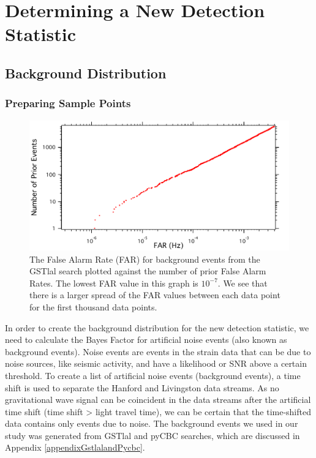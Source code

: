 \documentclass{article}
\begin{document}
 \newpage
 \section{Determining a New Detection Statistic}
 
 
 \subsection{Background Distribution}
 
 
 
 
 \subsubsection{Preparing Sample Points}
 
 
   \begin{figure}[h]
   	\centering
   	\includegraphics[width=1\textwidth]{Figures/FAP_Count.pdf} 
   	\caption{The False Alarm Rate (FAR) for background events from the GSTlal search plotted against the number of prior False Alarm Rates. The lowest FAR value in this graph is $10^{-7}$. We see that there is a larger spread of the FAR values between each data point for the first thousand data points.}
   	\label{Fig:FAR_Count}
   \end{figure}
   
   
 
 
 In order to create the background distribution for the new detection statistic, we need to calculate the Bayes Factor for artificial noise events (also known as background events). Noise events are events in the strain data that can be due to noise sources, like seismic activity, and have a likelihood or SNR above a certain threshold. To create a list of artificial noise events (background events),  a time shift is used to separate the Hanford and Livingston data streams. As no gravitational wave signal can be coincident in the data streams after the artificial time shift (time shift > light travel time), we can be certain that the time-shifted data contains only events due to noise. The background events we used in our study was generated from GSTlal and pyCBC searches, which are discussed in Appendix \ref{appendixGstlalandPycbc}.\\
\end{document}

